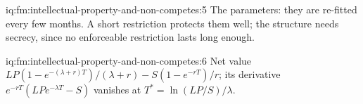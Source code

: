 \begin{solution}{iq:fm:intellectual-property-and-non-competes:5}
The parameters: they are re-fitted every few months. A short restriction protects them well; the structure needs secrecy, since no enforceable
restriction lasts long enough.
\end{solution}

\begin{solution}{iq:fm:intellectual-property-and-non-competes:6}
Net value $LP(1-e^{-(\lambda+r)T})/(\lambda+r)-S(1-e^{-rT})/r$; its derivative $e^{-rT}(LPe^{-\lambda T}-S)$ vanishes at $T^*=\ln(LP/S)/\lambda$.
\end{solution}
